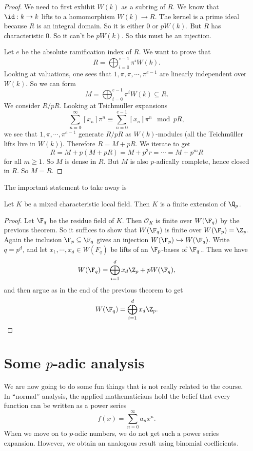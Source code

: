 \documentclass[a4paper]{article}
\begin{document}
\begin{proof}
  We need to first exhibit $W(k)$ as a subring of $R$. We know that $\id: k \to k$ lifts to a homomorphism $W(k) \to R$. The kernel is a prime ideal because $R$ is an integral domain. So it is either $0$ or $p W(k)$. But $R$ has characteristic $0$. So it can't be $pW(k)$. So this must be an injection.

  Let $e$ be the absolute ramification index of $R$. We want to prove that
  \[
    R = \bigoplus_{i = 0}^{e - 1} \pi^i W(k).
  \]
  Looking at valuations, one sees that $1, \pi, \pi, \cdots, \pi^{e - 1}$ are linearly independent over $W(k)$. So we can form
  \[
    M = \bigoplus_{i = 0}^{e - 1} \pi^i W(k) \subseteq R.
  \]
  We consider $R/pR$. Looking at Teichm\"uller expansions
  \[
    \sum_{n = 0}^\infty [x_n] \pi^n \equiv \sum_{n = 0}^{e - 1} [x_n]\pi^n \mod pR,
  \]
  we see that $1, \pi, \cdots, \pi^{e - 1}$ generate $R/pR$ as $W(k)$-modules (all the Teichm\"uller lifts live in $W(k)$). Therefore $R = M + pR$. We iterate to get
  \[
    R = M + p(M + pR) = M + p^2 r = \cdots = M + p^m R
  \]
  for all $m \geq 1$. So $M$ is dense in $R$. But $M$ is also $p$-adically complete, hence closed in $R$. So $M = R$.
\end{proof}

The important statement to take away is
\begin{cor}
  Let $K$ be a mixed characteristic local field. Then $K$ is a finite extension of $\Q_p$.
\end{cor}

\begin{proof}
  Let $\F_q$ be the residue field of $K$. Then $\mathcal{O}_K$ is finite over $W(\F_q)$ by the previous theorem. So it suffices to show that $W(\F_q)$ is finite over $W(\F_p) = \Z_p$. Again the inclusion $\F_p \subseteq \F_q$ gives an injection $W(\F_p) \hookrightarrow W(\F_q)$. Write $q = p^d$, and let $x_1, \cdots, x_d \in W(F_q)$ be lifts of an $\F_p$-bases of $\F_q$.. Then we have
  \[
    W(\F_q) = \bigoplus_{i = 1}^d x_d \Z_p + p W(\F_q),
  \]
  and then argue as in the end of the previous theorem to get
  \[
    W(\F_q) = \bigoplus_{i = 1}^d x_d \Z_p. \qedhere
  \]
\end{proof}

\section{Some \texorpdfstring{$p$}{p}-adic analysis}
We are now going to do some fun things that is not really related to the course. In ``normal'' analysis, the applied mathematicians hold the belief that every function can be written as a power series
\[
  f(x) = \sum_{n = 0}^\infty a_n x^n.
\]
When we move on to $p$-adic numbers, we do not get such a power series expansion. However, we obtain an analogous result using binomial coefficients.
\end{document}
